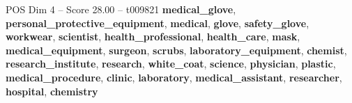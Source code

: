 \begin{textsample}{POS Dim 4 – Score 28.00 – t009821}  \label{ex:f4_pos_039}
\textbf{medical\_glove}, \textbf{personal\_protective\_equipment}, \textbf{medical}, \textbf{glove}, \textbf{safety\_glove}, \textbf{workwear}, \textbf{scientist}, \textbf{health\_professional}, \textbf{health\_care}, \textbf{mask}, \textbf{medical\_equipment}, \textbf{surgeon}, \textbf{scrubs}, \textbf{laboratory\_equipment}, \textbf{chemist}, \textbf{research\_institute}, \textbf{research}, \textbf{white\_coat}, \textbf{science}, \textbf{physician}, \textbf{plastic}, \textbf{medical\_procedure}, \textbf{clinic}, \textbf{laboratory}, \textbf{medical\_assistant}, \textbf{researcher}, \textbf{hospital}, \textbf{chemistry}

\end{textsample}
